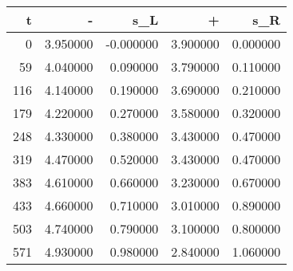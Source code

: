 \begin{tabular}{rrrrr}
\toprule
t & - & s_L & + & s_R \\
\midrule
0 & 3.950000 & -0.000000 & 3.900000 & 0.000000 \\
59 & 4.040000 & 0.090000 & 3.790000 & 0.110000 \\
116 & 4.140000 & 0.190000 & 3.690000 & 0.210000 \\
179 & 4.220000 & 0.270000 & 3.580000 & 0.320000 \\
248 & 4.330000 & 0.380000 & 3.430000 & 0.470000 \\
319 & 4.470000 & 0.520000 & 3.430000 & 0.470000 \\
383 & 4.610000 & 0.660000 & 3.230000 & 0.670000 \\
433 & 4.660000 & 0.710000 & 3.010000 & 0.890000 \\
503 & 4.740000 & 0.790000 & 3.100000 & 0.800000 \\
571 & 4.930000 & 0.980000 & 2.840000 & 1.060000 \\
\bottomrule
\end{tabular}

